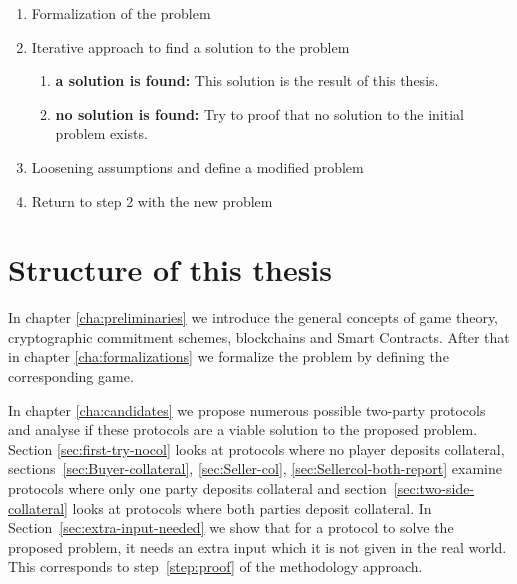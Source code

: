\documentclass{cacthesis}
\begin{document}
	\begin{enumerate}
	    \item Formalization of the problem \label{step:1}
	    \item Iterative approach to find a solution to the problem \label{step:2}
	            \begin{enumerate}
	            \item \textbf{a solution is found:} This solution is the result of this thesis. \label{step:solution}
	           \item \textbf{no solution is found:} Try to proof that no solution to the initial problem exists. \label{step:proof}
	        \end{enumerate}
	    \item Loosening assumptions and define a modified problem \label{step:modified-problem}
	    \item Return to step 2 with the new problem\label{step:return2}
	\end{enumerate}

	\section{Structure of this thesis}
	In chapter \ref{cha:preliminaries} we introduce the general concepts of game theory, cryptographic commitment schemes, blockchains and Smart Contracts.  After that in chapter \ref{cha:formalizations} we formalize the problem by defining the corresponding game.\newline %
	
	In chapter \ref{cha:candidates} we propose numerous possible two-party protocols and analyse if these protocols are a viable solution to the proposed problem. Section \ref{sec:first-try-nocol} looks at protocols where no player deposits collateral, sections~\ref{sec:Buyer-collateral}, \ref{sec:Seller-col}, \ref{sec:Sellercol-both-report} examine protocols where only one party deposits collateral and section~\ref{sec:two-side-collateral} looks at protocols where both parties deposit collateral. In Section~\ref{sec:extra-input-needed} we show that for a protocol to solve the proposed problem, it needs an extra input which it is not given in the real world. This corresponds to step~\ref{step:proof} of the methodology approach.  \newline
	
\end{document}
